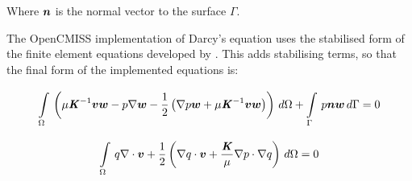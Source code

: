 Where $\boldsymbol{n}$ is the normal vector to the surface $\Gamma$.

The OpenCMISS implementation of Darcy's equation uses the stabilised form of the finite element
equations developed by \cite{masud:2002}. This adds stabilising terms, so that the final form
of the implemented equations is:

\begin{equation}
  \gint{\Omega}{}{\pbrac{\mu \inverse{\tensor{K}} \vectr{v} \vectr{w} - p \gradient{}{\vectr{w}} - %
  \frac{1}{2} \pbrac{\gradient{}{p} \vectr{w} + \mu \inverse{\tensor{K}} \vectr{v} \vectr{w}}}}{\Omega} + %
  \gint{\Gamma}{}{p \vectr{n} \vectr{w}}{\Gamma}= 0
\end{equation}

\begin{equation}
  \gint{\Omega}{}{q \divergence{}{\vectr{v}} + %
  \frac{1}{2} \pbrac{\dotprod{\gradient{}{q}}{\vectr{v}} + %
  \frac{\tensor{K}}{\mu} \dotprod{\gradient{}{p}}{\gradient{}{q}}}}{\Omega}= 0
\end{equation}
